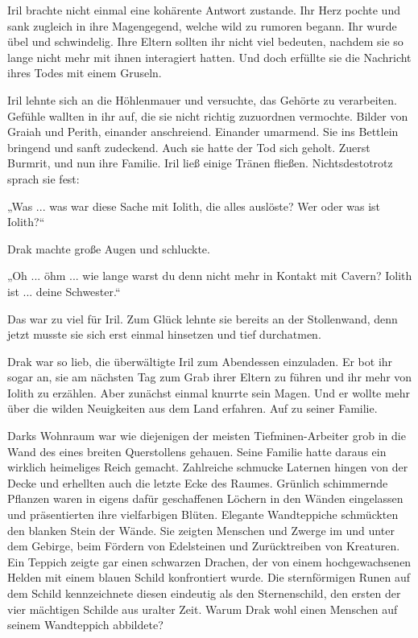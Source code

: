 Iril brachte nicht einmal eine kohärente Antwort zustande. Ihr Herz pochte und sank zugleich in ihre Magengegend, welche wild zu rumoren begann. Ihr wurde übel und schwindelig. Ihre Eltern sollten ihr nicht viel bedeuten, nachdem sie so lange nicht mehr mit ihnen interagiert hatten. Und doch erfüllte sie die Nachricht ihres Todes mit einem Gruseln.

Iril lehnte sich an die Höhlenmauer und versuchte, das Gehörte zu verarbeiten. Gefühle wallten in ihr auf, die sie nicht richtig zuzuordnen vermochte. Bilder von Graiah und Perith, einander anschreiend. Einander umarmend. Sie ins Bettlein bringend und sanft zudeckend. Auch sie hatte der Tod sich geholt. Zuerst Burmrit, und nun ihre Familie. Iril ließ einige Tränen fließen. Nichtsdestotrotz sprach sie fest:

„Was ... was war diese Sache mit Iolith, die alles auslöste? Wer oder was ist Iolith?“

Drak machte große Augen und schluckte.

„Oh ... öhm ... wie lange warst du denn nicht mehr in Kontakt mit Cavern? Iolith ist ... deine Schwester.“

Das war zu viel für Iril. Zum Glück lehnte sie bereits an der Stollenwand, denn jetzt musste sie sich erst einmal hinsetzen und tief durchatmen.\bigskip







Drak war so lieb, die überwältigte Iril zum Abendessen einzuladen. Er bot ihr sogar an, sie am nächsten Tag zum Grab ihrer Eltern zu führen und ihr mehr von Iolith zu erzählen. Aber zunächst einmal knurrte sein Magen. Und er wollte mehr über die wilden Neuigkeiten aus dem Land erfahren. Auf zu seiner Familie.

Darks Wohnraum war wie diejenigen der meisten Tiefminen-Arbeiter grob in die Wand des eines breiten Querstollens gehauen. Seine Familie hatte daraus ein wirklich heimeliges Reich gemacht. Zahlreiche schmucke Laternen hingen von der Decke und erhellten auch die letzte Ecke des Raumes. Grünlich schimmernde Pflanzen waren in eigens dafür geschaffenen Löchern in den Wänden eingelassen und präsentierten ihre vielfarbigen Blüten. Elegante Wandteppiche schmückten den blanken Stein der Wände. Sie zeigten Menschen und Zwerge im und unter dem Gebirge, beim Fördern von Edelsteinen und Zurücktreiben von Kreaturen. Ein Teppich zeigte gar einen schwarzen Drachen, der von einem hochgewachsenen Helden mit einem blauen Schild konfrontiert wurde. Die sternförmigen Runen auf dem Schild kennzeichnete diesen eindeutig als den Sternenschild, den ersten der vier mächtigen Schilde aus uralter Zeit. Warum Drak wohl einen Menschen auf seinem Wandteppich abbildete?

